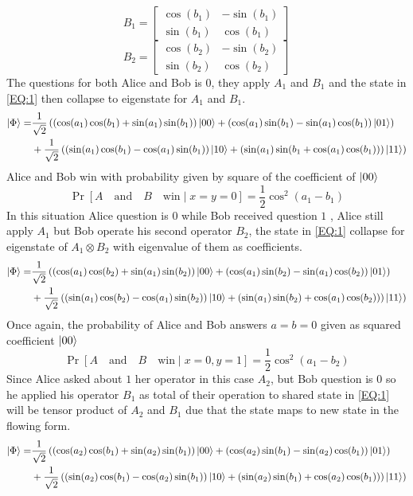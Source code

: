 \[
B_1=
  \begin{bmatrix}
   \cos(b_1) & -\sin(b_1)\\
   \sin(b_1) & \cos(b_1)
  \end{bmatrix}
\]
\[
B_2=
  \begin{bmatrix}
   \cos(b_2) & -\sin(b_2)\\
   \sin(b_2) & \cos(b_2)
  \end{bmatrix}
\]
The questions  for both Alice and Bob is  $0$, they apply $A_1$ and $B_1$ and the state in \ref{EQ:1} then collapse to eigenstate for $A_1$ and $B_1$.
\begin{align*}
\ket{\Phi}=&\frac{1}{\sqrt{2}}\left( \left(\cos(a_1) \cos(b_1) +\sin(a_1) \sin(b_1)\right)\ket{00}  +\left(\cos(a_1) \sin(b_1) -\sin(a_1) \cos(b_1)\right)\ket{01}\right)\\
&+\frac{1}{\sqrt{2}}\left(\left(\sin(a_1) \cos(b_1)-\cos(a_1) \sin(b_1)\right)\ket{10} +\left(\sin(a_1) \sin(b_1+\cos(a_1) \cos(b_1) )\right)\ket{11}\right)
\end{align*}
Alice and Bob win with  probability given by square of the coefficient of $\ket{00} $
$$\Pr[A\quad \text{and}\quad B \quad \text{win}\mid   x=y=0]=\frac{1}{2}\cos^2(a_1-b_1)$$
In this situation Alice question is $0$ while Bob received question $1$ , Alice still apply $A_1$ but Bob operate his second operator $B_2$, the state in \ref{EQ:1} collapse for eigenstate of $A_1 \otimes B_2$ with eigenvalue of them as coefficients.
 \begin{align*}
\ket{\Phi}=&\frac{1}{\sqrt{2}}\left( \left(\cos(a_1) \cos(b_2) +\sin(a_1) \sin(b_2)\right)\ket{00}  +\left(\cos(a_1) \sin(b_2) -\sin(a_1) \cos(b_2)\right)\ket{01}\right)\\
&+\frac{1}{\sqrt{2}}\left(\left(\sin(a_1) \cos(b_2)-\cos(a_1) \sin(b_2)\right)\ket{10} +\left(\sin(a_1) \sin(b_2)+\cos(a_1) \cos(b_2) )\right)\ket{11}\right)
\end{align*}
Once again, the probability of Alice and Bob answers $a=b=0$  given as squared coefficient  $\ket{00}$
$$\Pr[A\quad \text{and}\quad B \quad \text{win}\mid   x=0 ,y=1]=\frac{1}{2}\cos^2(a_1-b_2)$$
Since Alice asked about $1$ her operator in this case $A_2$, but Bob question is $0$ so he applied his operator $B_1$ as total of their operation to shared state in  \ref{EQ:1} will be tensor product of $A_2$ and $B_1$ due that the state maps to new state in the flowing form.
\begin{align*}
\ket{\Phi}=&\frac{1}{\sqrt{2}}\left( \left(\cos(a_2) \cos(b_1) +\sin(a_2) \sin(b_1)\right)\ket{00}  +\left(\cos(a_2) \sin(b_1) -\sin(a_2) \cos(b_1)\right)\ket{01}\right)\\
&+\frac{1}{\sqrt{2}}\left(\left(\sin(a_2) \cos(b_1)-\cos(a_2) \sin(b_1)\right)\ket{10} +\left(\sin(a_2) \sin(b_1)+\cos(a_2) \cos(b_1) )\right)\ket{11}\right)
\end{align*}
